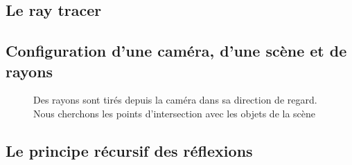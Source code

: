 \documentclass[11pt]{article}
\begin{document}
\newpage%
\begin{appendices}
	\section{Le ray tracer}
		\subsection{Configuration d'une caméra, d'une scène et de rayons}
		\begin{figure}[h!]

			\caption{Des rayons sont tirés depuis la caméra dans sa direction de regard. Nous cherchons les points d'intersection avec les objets de la scène}
		\end{figure}
		\FloatBarrier
		\label{annexe:repreCamRayon}

		\subsection{Le principe récursif des réflexions}
		\begin{figure}[!h]


\end{figure}
\end{appendices}
\end{document}
